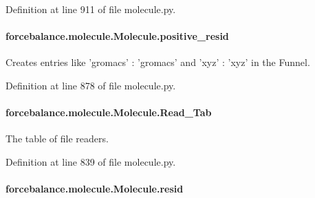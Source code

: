 Definition at line 911 of file molecule.\-py.

\hypertarget{classforcebalance_1_1molecule_1_1Molecule_af9d8dc89fee54b2b89558633f2c9b70a}{
\paragraph[{positive\-\_\-resid}]{\setlength{\rightskip}{0pt plus 5cm}forcebalance.\-molecule.\-Molecule.\-positive\-\_\-resid}}\label{classforcebalance_1_1molecule_1_1Molecule_af9d8dc89fee54b2b89558633f2c9b70a}


Creates entries like 'gromacs' \-: 'gromacs' and 'xyz' \-: 'xyz' in the Funnel. 



Definition at line 878 of file molecule.\-py.

\hypertarget{classforcebalance_1_1molecule_1_1Molecule_a35600d98f150597c9d9ac5129e01bd8d}{
\paragraph[{Read\-\_\-\-Tab}]{\setlength{\rightskip}{0pt plus 5cm}forcebalance.\-molecule.\-Molecule.\-Read\-\_\-\-Tab}}\label{classforcebalance_1_1molecule_1_1Molecule_a35600d98f150597c9d9ac5129e01bd8d}


The table of file readers. 



Definition at line 839 of file molecule.\-py.

\hypertarget{classforcebalance_1_1molecule_1_1Molecule_a7ce0cbbc2f774aaffe3b6ca78b658736}{
\paragraph[{resid}]{\setlength{\rightskip}{0pt plus 5cm}forcebalance.\-molecule.\-Molecule.\-resid}}\label{classforcebalance_1_1molecule_1_1Molecule_a7ce0cbbc2f774aaffe3b6ca78b658736}


